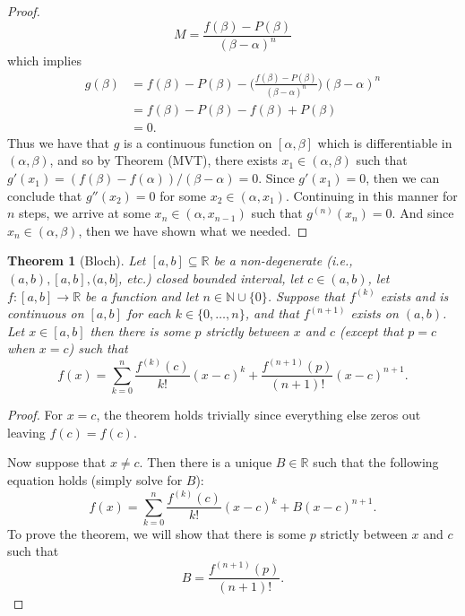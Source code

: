 \documentclass[12pt]{article}
\newtheorem{theorem}{Theorem}
\theoremstyle{definition}
\theoremstyle{definition}
\begin{document}
\begin{proof}
\begin{equation*}
           M =\frac{f(\beta)-P(\beta)}{(\beta-\alpha)^n}
       \end{equation*}
       which implies
       \begin{align*}
           g(\beta)&=f(\beta)-P(\beta)-\bigg(\frac{f(\beta)-P(\beta)}{(\beta-\alpha)^n}\bigg)
           (\beta-\alpha)^n \\
           &=f(\beta)-P(\beta)-f(\beta)+P(\beta) \\
           &= 0. 
       \end{align*}
       Thus we have that $g$ is a continuous function on $[\alpha, \beta]$
       which is differentiable in $(\alpha, \beta)$, and so by Theorem (MVT),
       there exists $x_1\in(\alpha, \beta)$ such that
       $g'(x_1)=(f(\beta)-f(\alpha))/(\beta-\alpha)=0$. Since $g'(x_1)=0$, then
       we can conclude that $g''(x_2)=0$ for some $x_2\in(\alpha, x_1)$.
       Continuing in this manner for $n$ steps, we arrive at some
       $x_n\in(\alpha, x_{n-1})$ such that $g^{(n)}(x_n)=0$. And since
       $x_n\in(\alpha, \beta)$, then we have shown what we needed. 
    \end{proof}
    \begin{theorem}[Bloch]
        Let $[a, b]\subseteq\mathbb{R}$ be a non-degenerate (i.e., $(a, b), [a,
        b], (a, b]$, etc.) closed bounded interval, let $c\in(a, b)$, let
        $f:[a, b]\to\mathbb{R}$ be a function and let
        $n\in\mathbb{N}\cup\{0\}$. Suppose that $f^{(k)}$ exists and is
        continuous on $[a, b]$ for each $k\in\{0, \dots, n\}$, and that
        $f^{(n+1)}$ exists on $(a, b)$. Let $x\in[a, b]$ then there is some
        $p$ strictly between $x$ and $c$ (except that $p=c$ when $x=c$) such
        that
        \begin{equation*}
            f(x)=\sum_{k=0}^{n}\frac{f^{(k)}(c)}{k!}(x-c)^k+\frac{f^{(n+1)}(p)}{(n+1)!}(x-c)^{n+1}.
        \end{equation*}
    \end{theorem}
    \begin{proof}
        For $x=c$, the theorem holds trivially since everything else zeros out
        leaving $f(c)=f(c)$.\par\hspace{4mm} Now suppose that $x\neq c$. Then
        there is a unique $B\in\mathbb{R}$ such that the following equation
        holds (simply solve for $B$):
        \begin{equation*}
            f(x)=\sum_{k=0}^{n}\frac{f^{(k)}(c)}{k!}(x-c)^k+B(x-c)^{n+1}.
        \end{equation*}
        To prove the theorem, we will show that there is some $p$ strictly
        between $x$ and $c$ such that 
        \begin{equation}
            B=\frac{f^{(n+1)}(p)}{(n+1)!}.
        \end{equation}
    \end{proof}
\end{document}
